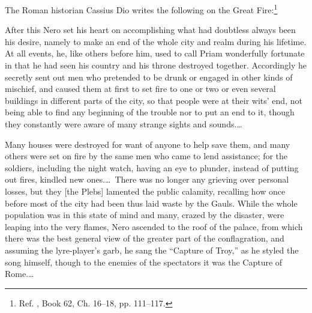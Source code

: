 \documentclass[letterpaper,12pt]{article}
\newenvironment{squotation}
  {\small\quotation}
  {\endquotation\normalsize}
\begin{document}
The Roman historian Cassius Dio writes the following on the Great Fire:\footnote{Ref. , Book 62, Ch. 16--18, pp. 111--117.}

\begin{squotation}
After this Nero set his heart on accomplishing what had doubtless always been his desire, namely to make an end of the whole city and realm during his lifetime. At all events, he, like others before him, used to call Priam wonderfully fortunate in that he had seen his country and his throne destroyed together. Accordingly he secretly sent out men who pretended to be drunk or engaged in other kinds of mischief, and caused them at first to set fire to one or two or even several buildings in different parts of the city, so that people were at their wits' end, not being able to find any beginning of the trouble nor to put an end to it, though they constantly were aware of many strange sights and sounds.\thinspace\ldots

Many houses were destroyed for want of anyone to help save them, and many others were set on fire by the same men who came to lend assistance; for the soldiers, including the night watch, having an eye to plunder, instead of putting out fires, kindled new ones.\thinspace\ldots\ There was no longer any grieving over personal losses, but they [the Plebs] lamented the public calamity, recalling how once before most of the city had been thus laid waste by the Gauls. While the whole population was in this state of mind and many, crazed by the disaster, were leaping into the very flames, Nero ascended to the roof of the palace, from which there was the best general view of the greater part of the conflagration, and assuming the lyre-player's garb, he sang the ``Capture of Troy,'' as he styled the song himself, though to the enemies of the spectators it was the Capture of Rome.\thinspace\ldots


\end{squotation}
\end{document}
